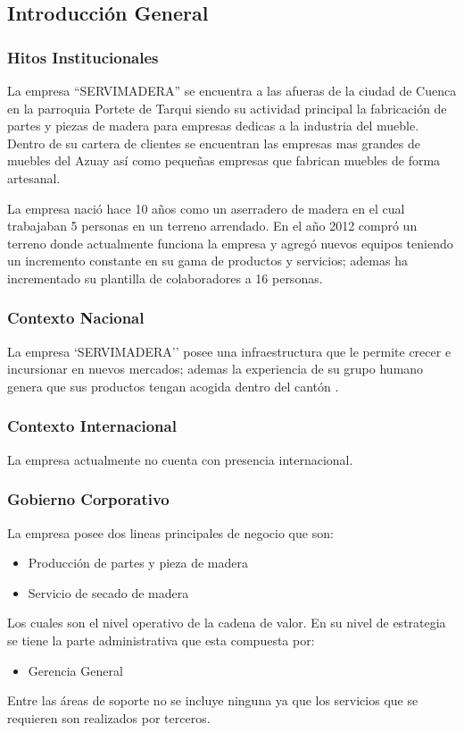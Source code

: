 \documentclass[12pt, a4paper]{article}
\begin{document}
\subsection{Introducción General}
\subsubsection{Hitos Institucionales}

La empresa ``SERVIMADERA'' se encuentra a las afueras de la ciudad de Cuenca en la parroquia Portete de Tarqui siendo su actividad principal la fabricación de partes y piezas de madera para empresas dedicas a la industria del mueble. Dentro de su cartera de clientes se  encuentran las empresas mas grandes de muebles del Azuay así como pequeñas empresas que fabrican muebles de forma artesanal.

La empresa nació hace 10 años como un aserradero  de madera  en el cual trabajaban 5 personas en un terreno arrendado.   En el año 2012 compró un terreno donde actualmente funciona la empresa y agregó nuevos equipos teniendo un incremento  constante en su gama de productos y servicios; ademas  ha incrementado su plantilla de colaboradores a 16 personas.

\subsubsection{Contexto Nacional}
La empresa `SERVIMADERA'' posee una infraestructura  que le permite crecer e incursionar en nuevos mercados; ademas la experiencia de su grupo humano genera que sus productos tengan acogida dentro del cantón . 


\subsubsection{Contexto Internacional}
La empresa actualmente no cuenta con presencia internacional.

\subsubsection{Gobierno Corporativo}
La empresa posee dos lineas principales de negocio que son:
\begin{itemize}
	\item Producción de partes y pieza de madera
	\item Servicio de secado de madera
\end{itemize}

Los cuales son el nivel operativo de la cadena de valor. En su nivel de estrategia se tiene la parte administrativa que esta compuesta por:
\begin{itemize}
\item Gerencia General
\end{itemize}
Entre las áreas de soporte no se incluye ninguna ya que los servicios que se requieren son realizados por terceros.
\end{document}
